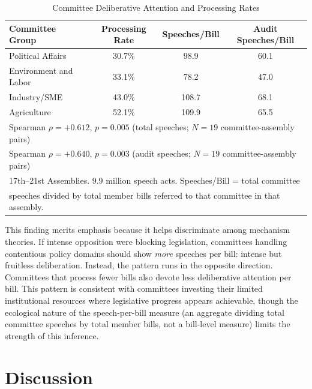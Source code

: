 \documentclass[11pt]{article}
\begin{document}
\begin{table}[htbp]
\centering
\caption{Committee Deliberative Attention and Processing Rates}
\label{tab:speech}
\begin{tabular}{lccc}
\toprule
Committee Group & Processing Rate & Speeches/Bill & Audit Speeches/Bill \\
\midrule
Political Affairs & 30.7\% & 98.9 & 60.1 \\
Environment and Labor & 33.1\% & 78.2 & 47.0 \\
Industry/SME & 43.0\% & 108.7 & 68.1 \\
Agriculture & 52.1\% & 109.9 & 65.5 \\
\midrule
\multicolumn{4}{l}{Spearman $\rho = +0.612$, $p = 0.005$ (total speeches; $N = 19$ committee-assembly pairs)} \\
\multicolumn{4}{l}{Spearman $\rho = +0.640$, $p = 0.003$ (audit speeches; $N = 19$ committee-assembly pairs)} \\
\bottomrule
\multicolumn{4}{l}{\footnotesize 17th--21st Assemblies. 9.9 million speech acts. Speeches/Bill = total committee} \\
\multicolumn{4}{l}{\footnotesize speeches divided by total member bills referred to that committee in that assembly.} \\
\end{tabular}
\end{table}

This finding merits emphasis because it helps discriminate among mechanism theories. If intense opposition were blocking legislation, committees handling contentious policy domains should show \emph{more} speeches per bill: intense but fruitless deliberation. Instead, the pattern runs in the opposite direction. Committees that process fewer bills also devote less deliberative attention per bill. This pattern is consistent with committees investing their limited institutional resources where legislative progress appears achievable, though the ecological nature of the speech-per-bill measure (an aggregate dividing total committee speeches by total member bills, not a bill-level measure) limits the strength of this inference.



\section{Discussion}
\label{sec:discussion}
\end{document}
